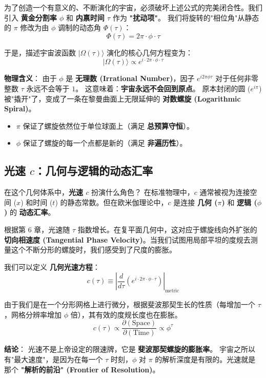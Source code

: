 为了创造一个有意义的、不断演化的宇宙，必须破坏上述公式的完美闭合性。我们引入 \textbf{黄金分割率 $\phi$} 和 \textbf{内禀时间 $\tau$} 作为 \textbf{"扰动项"}。
我们将旋转的"相位角"从静态的 $\pi$ 修改为由 $\phi$ 调制的动态角 $\Phi(\tau)$：
\[\Phi(\tau) = 2\pi \cdot \phi \cdot \tau\]

于是，描述宇宙波函数 $|\Omega(\tau)\rangle$ 演化的核心几何方程变为：
\[|\Omega(\tau)\rangle \propto e^{i \cdot 2\pi \cdot \phi \cdot \tau}\]

\textbf{物理含义}：
由于 $\phi$ 是 \textbf{无理数 (Irrational Number)}，因子 $e^{i 2\pi \phi \tau}$ 对于任何非零整数 $\tau$ 永远不会等于 $1$。
这意味着：\textbf{宇宙永远不会回到原点}。
原本封闭的圆 ($e^{i\pi}$) 被"撬开"了，变成了一条在黎曼曲面上无限延伸的 \textbf{对数螺旋 (Logarithmic Spiral)}。

\begin{itemize}
\item \textbf{$\pi$} 保证了螺旋依然位于单位球面上（满足 \textbf{总预算守恒}）。
\item \textbf{$\phi$} 保证了螺旋的每一个点都是新的（满足 \textbf{非遍历性}）。
\end{itemize}

\subsection{光速 $c$：几何与逻辑的动态汇率}

在这个几何体系中，\textbf{光速 $c$} 扮演什么角色？
在标准物理中，$c$ 通常被视为连接空间 ($x$) 和时间 ($t$) 的静态常数。但在欧米伽理论中，$c$ 是连接 \textbf{几何 ($\pi$)} 和 \textbf{逻辑 ($\phi$)} 的 \textbf{动态汇率}。

根据第 6 章，光速随 $\tau$ 指数增长。在复平面几何中，这对应于螺旋线向外扩张的 \textbf{切向相速度 (Tangential Phase Velocity)}。当我们试图用局部平坦的度规去测量这个不断分形的螺旋时，我们感受到了尺度的膨胀。

我们可以定义 \textbf{几何光速方程}：
\[c(\tau) \equiv \left| \frac{d}{d\tau} \left( e^{i \cdot 2\pi \cdot \phi \cdot \tau} \right) \right|_{\text{metric}}\]

由于我们是在一个分形网格上进行微分，根据斐波那契生长的性质（每增加一个 $\tau$，网格分辨率增加 $\phi$ 倍），其有效的度规长度也在膨胀。
\[c(\tau) \propto \frac{\partial (\text{Space})}{\partial (\text{Time})} \propto \phi^{\tau}\]

\textbf{结论}：
光速不是上帝设定的限速牌，它是 \textbf{斐波那契螺旋的膨胀率}。
宇宙之所以有"最大速度"，是因为在每一个 $\tau$ 时刻，$\phi$ 对 $\pi$ 的解析深度是有限的。光速就是那个 \textbf{"解析的前沿" (Frontier of Resolution)}。

